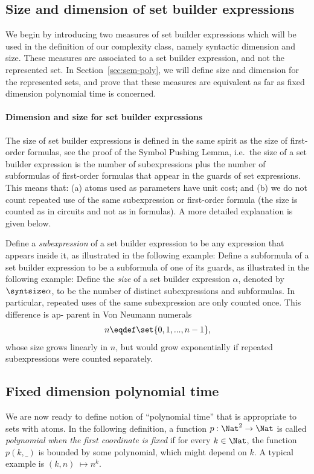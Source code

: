 
\subsection*{Size and dimension of set builder expressions}

We begin by introducing two measures of set builder expressions which will be used in the definition of our complexity class, namely syntactic dimension and size. These measures are associated to a set builder expression, and not the represented set. In Section~\ref{sec:sem-poly}, we will define size and dimension for the represented sets, and prove that these measures are equivalent as far as fixed dimension polynomial time is concerned. 

\paragraph*{Dimension and size for set builder expressions} The size of set builder expressions is defined in the same spirit as the size of first-order formulas, see the proof of the Symbol Pushing Lemma, i.e.~the size of a set builder expression is the number of subexpressions plus the number of subformulas of first-order formulas that appear in the guards of set expressions. This means that: (a) atoms used as parameters have unit cost; and (b) we do not count repeated use of the same subexpression or first-order formula (the size is counted as in circuits and not as in formulas). A more detailed explanation is given below. 



Define a \emph{subexpression} of a set builder expression to be any expression that appears inside it, as illustrated in the following example:
Define a subformula of a set builder expression to be a subformula of one of its guards, as illustrated in the following example:
Define the \emph{size} of a set builder expression $\alpha$, denoted by $\syntsize \alpha$, to be the number of distinct subexpressions and subformulas. In particular, repeated uses of the same subexpression are only counted once. This difference is ap- parent in Von Neumann numerals
\begin{align*}
n \eqdef \set{0,1,...,n-1}, 
\end{align*}
whose size grows linearly in $n$, but would grow exponentially if repeated subexpressions were counted separately.





\subsection*{Fixed dimension polynomial time}
We are now ready to define notion of ``polynomial time'' that is appropriate to sets with atoms. In the following definition, a function $p : \Nat^2 \to \Nat$ is called \emph{polynomial when the first coordinate is fixed} if for every $k \in \Nat$, the function $p(k,\_)$ is bounded by some polynomial, which might depend on $k$. A typical example is $(k, n) 􏰀\mapsto n^k$.






